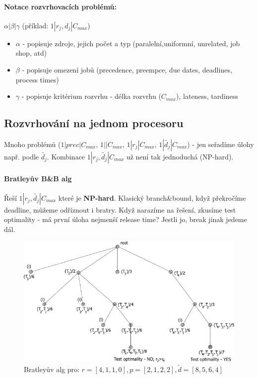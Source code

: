 \paragraph{Notace rozvrhovacích problémů:} $\alpha | \beta | \gamma$ (příklad: $1|r_j,d_j|C_{max}$)
\begin{itemize}
\item $\alpha$ - popisuje zdroje, jejich počet a typ (paralelní,uniformní, unrelated, job shop, atd)
\item $\beta$ - popisuje omezení jobů (precedence, preempce, due dates, deadlines, process times)
\item $\gamma$ - popisuje kritérium rozvrhu - délka rozvrhu ($C_{max}$), lateness, tardiness
\end{itemize}

\subsection{Rozvrhování na jednom procesoru}
Mnoho  problémů ($1|prec|C_{max}$, $1||C_{max}$, $1|r_j|C_{max}$, $1|\widetilde{d_j}|C_{max}$) - jen seřadíme úlohy např. podle $\widetilde{d_j}$. Kombinace $1|r_j,\widetilde{d_j}|C_{max}$ už není tak jednoduchá (NP-hard).

\paragraph{Bratleyův B\&B alg} Řeší \textbf{$1|r_j,\widetilde{d_j}|C_{max}$} které je \textbf{NP-hard}. Klasický branch\&bound, když překročíme deadline, můžeme odříznout i bratry. Když narazíme na řešení, zkusíme test optimality - má první úloha nejmenší release time? Jestli jo, break jinak jedeme dál.

\begin{figure}[h]
    \begin{center}
        \includegraphics[width=130mm]{10/images/bratley}
    \end{center}
    \caption{Bratleyův alg pro: $r=[4,1,1,0], p=[2,1,2,2], \widetilde{d}=[8,5,6,4]$}
\end{figure}

